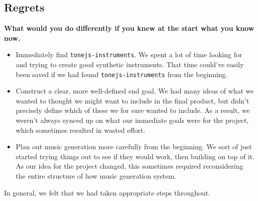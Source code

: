 \documentclass[12pt,a4paper]{article}
\newcommand{\lightcode}[1]{\colorbox{light-gray}{\texttt{#1}}}
\begin{document}
\subsection{Regrets}
\textbf{What would you do differently if you knew at the start what you know now.}
\begin{itemize}
	\item Immediately find \lightcode{tonejs-instruments}. We spent a lot of time looking for and trying to create good synthetic instruments. That time could've easily been saved if we had found \lightcode{tonejs-instruments} from the beginning.
	\item Construct a clear, more well-defined end goal. We had many ideas of what we wanted to thought we might want to include in the final product, but didn't precisely define which of these we for sure wanted to include. As a result, we weren't always synced up on what our immediate goals were for the project, which sometimes resulted in wasted effort.
	\item Plan out music generation more carefully from the beginning. We sort of just started trying things out to see if they would work, then building on top of it. As our idea for the project changed, this sometimes required reconsidering the entire structure of how music generation system.
\end{itemize}

In general, we felt that we had taken appropriate steps throughout.
\end{document}
